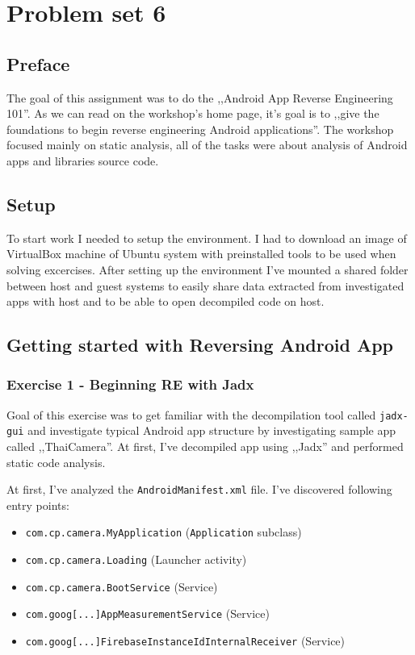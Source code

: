 \section{Problem set 6}
\subsection{Preface}

The goal of this assignment was to do the ,,Android App Reverse Engineering 101''. As we can read on the workshop's home page, it's goal is to ,,give the foundations to begin reverse engineering Android applications''. The workshop focused mainly on static analysis, all of the tasks were about analysis of Android apps and libraries source code.

\subsection{Setup}
To start work I needed to setup the environment. I had to download an image of VirtualBox machine of Ubuntu system with preinstalled tools to be used when solving excercises. After setting up the environment I've mounted a shared folder between host and guest systems to easily share data extracted from investigated apps with host and to be able to open decompiled code on host.

\subsection{Getting started with Reversing Android App}
\subsubsection{Exercise 1 - Beginning RE with Jadx}
Goal of this exercise was to get familiar with the decompilation tool called \texttt{jadx-gui} and investigate typical Android app structure by investigating sample app called ,,ThaiCamera''. At first, I've decompiled app using ,,Jadx'' and performed static code analysis.

At first, I've analyzed the \texttt{AndroidManifest.xml} file. I've discovered following entry points:

\begin{itemize}
  \setlength\itemsep{0em}
  \item \texttt{com.cp.camera.MyApplication} (\texttt{Application} subclass)
  \item \texttt{com.cp.camera.Loading} (Launcher activity)
  \item \texttt{com.cp.camera.BootService} (Service)
  \item \texttt{com.goog[...]AppMeasurementService} (Service)
  \item \texttt{com.goog[...]FirebaseInstanceIdInternalReceiver} (Service)
\end{itemize}
